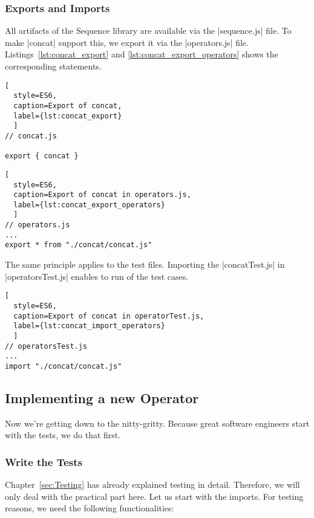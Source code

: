 \subsubsection{Exports and Imports}
\label{subsub:Exports and Imports}
All artifacts of the Sequence library are available via the |sequence.js| file.
To make |concat| support this, we export it via the |operators.js| file.
Listings~\ref{lst:concat_export} and \ref{lst:concat_export_operators} shows the corresponding statements.

\begin{lstlisting}[
  style=ES6, 
  caption=Export of concat,
  label={lst:concat_export}
  ]
// concat.js

export { concat }
\end{lstlisting}



\begin{lstlisting}[
  style=ES6, 
  caption=Export of concat in operators.js,
  label={lst:concat_export_operators}
  ]
// operators.js
...
export * from "./concat/concat.js"
\end{lstlisting}

The same principle applies to the test files. Importing the |concatTest.js| in
|operatorsTest.js| enables to run of the test cases.

\begin{lstlisting}[
  style=ES6, 
  caption=Export of concat in operatorTest.js,
  label={lst:concat_import_operators}
  ]
// operatorsTest.js
...
import "./concat/concat.js"
\end{lstlisting}

\subsection{Implementing a new Operator}
\label{subsub:Implementing a new Operator}
Now we're getting down to the nitty-gritty.
Because great software engineers start with the tests, we do that first.

\subsubsection{Write the Tests}
\label{subsub:Write the Tests}
Chapter~\ref{sec:Testing} has already explained testing in detail. Therefore, we will only deal 
with the practical part here.
\newline
Let us start with the imports. For testing reasons, we need the following
functionalities:

